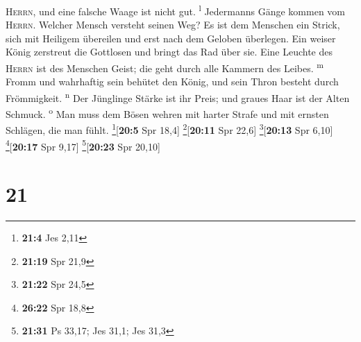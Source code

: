\textsc{Herrn}, und eine falsche Waage ist nicht gut.
\textsuperscript{l}  Jedermanns Gänge kommen vom
\textsc{Herrn}. Welcher Mensch versteht seinen Weg?  Es
ist dem Menschen ein Strick, sich mit Heiligem übereilen und erst nach
dem Geloben überlegen.  Ein weiser König zerstreut die
Gottlosen und bringt das Rad über sie.  Eine Leuchte des
\textsc{Herrn} ist des Menschen Geist; die geht durch alle Kammern des
Leibes. \textsuperscript{m}  Fromm und wahrhaftig sein
behütet den König, und sein Thron besteht durch Frömmigkeit.
\textsuperscript{n}  Der Jünglinge Stärke ist ihr Preis;
und graues Haar ist der Alten Schmuck. \textsuperscript{o}
 Man muss dem Bösen wehren mit harter Strafe und mit
ernsten Schlägen, die man fühlt. \footnote{\textbf{21:4} Jes 2,11}{[}\textbf{20:5}
Spr 18,4{]} \footnote{\textbf{21:19} Spr 21,9}{[}\textbf{20:11} Spr
22,6{]} \footnote{\textbf{21:22} Spr 24,5}{[}\textbf{20:13} Spr 6,10{]}
\footnote{\textbf{26:22} Spr 18,8}{[}\textbf{20:17} Spr 9,17{]}
\footnote{\textbf{21:31} Ps 33,17; Jes 31,1; Jes 31,3}{[}\textbf{20:23}
Spr 20,10{]}

\hypertarget{section-20}{%
\section{21}\label{section-20}}

